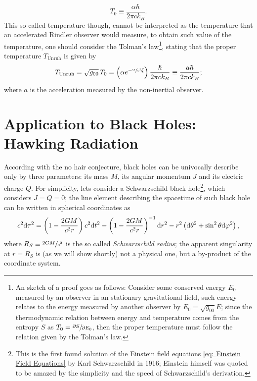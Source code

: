 \begin{equation}\label{eq: Unruh temp_0}
	T_0\equiv \frac{\alpha\hbar}{2\pi ck_B}.
\end{equation}
This so called temperature though, cannot be interpreted as the temperature that an accelerated Rindler observer would measure, to obtain such value of the temperature, one should consider the Tolman's law\footnote{An sketch of a proof goes as follows: Consider some conserved energy $E_0$ measured by an observer in an stationary gravitational field, such energy relates to the energy measured by another observer by $E_0=\sqrt{g_{00}}E$; since the thermodynamic relation between energy and temperature comes from the entropy $S$ as $T_0=\sfrac{\partial S}{\partial E_0}$, then the proper temperature must follow the relation given by the Tolman's law.}, stating that the proper temperature $T_{\text{Unruh}}$ is given by
\begin{equation}
	T_{\text{Unruh}}=\sqrt{g_{00}}\,T_0=\left(\alpha e^{-\sfrac{\alpha}{c^2}\xi}\right)\frac{\hbar}{2\pi ck_B}\equiv \frac{a\hbar}{2\pi ck_B};
\end{equation}
where $a$ is the acceleration measured by the non-inertial observer.

\section{Application to Black Holes: Hawking Radiation}
According with the no hair conjecture, black holes can be univocally describe only by three parameters: its mass $M$, its angular momentum $J$ and its electric charge $Q$. For simplicity, lets consider a Schwarzschild black hole\footnote{This is the first found solution of the Einstein field equations \ref{eq: Einstein Field Equations} by Karl Schwarzschild in 1916; Einstein himself was quoted to be amazed by the simplicity and the speed of Schwarzschild's derivation.}, which considers $J=Q=0$; the line element describing the spacetime of such black hole can be written in spherical coordinates as
\begin{equation}\label{eq: Schwarzschild line element}
	c^2\text{d}\tau^2=\left(1-\frac{2GM}{c^2r}\right)c^2\text{d} t^2-\left(1-\frac{2GM}{c^2r}\right)^{-1}\text{d} r^2-r^2\left(\text{d}\theta^2+\sin^2\theta\text{d}\varphi^2\right),
\end{equation}
where $R_S\equiv\sfrac{2GM}{c^2}$ is the so called \textit{Schwarzschild radius}; the apparent singularity at $r=R_S$ is (as we will show shortly) not a physical one, but a by-product of the coordinate system.

